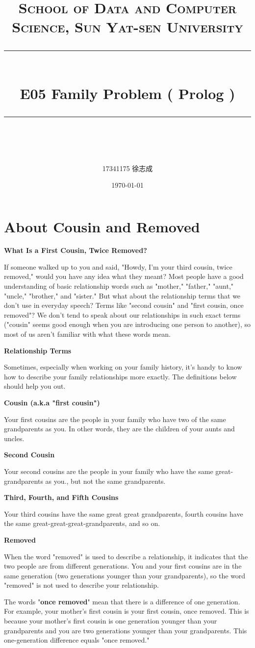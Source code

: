 ﻿\documentclass[a4paper, 11pt]{article}
\title{	
\normalfont \normalsize
\textsc{School of Data and Computer Science, Sun Yat-sen University} \\ [25pt] %
\rule{\textwidth}{0.5pt} \\[0.4cm] %
\huge  E05 Family Problem ( Prolog )\\ %
\rule{\textwidth}{2pt} \\[0.5cm] %
\author{17341175 徐志成}
\date{\normalsize\today}
}
\begin{document}
\maketitle
\tableofcontents
\newpage
\section{About Cousin and Removed}
\textbf{What Is a First Cousin, Twice Removed?}

If someone walked up to you and said, "Howdy, I'm your third cousin, twice removed," would you have any idea what they meant? Most people have a good understanding of basic relationship words such as "mother," "father," "aunt," "uncle," "brother," and "sister." But what about the relationship terms that we don't use in everyday speech? Terms like "second cousin" and "first cousin, once removed"? We don't tend to speak about our relationships in such exact terms ("cousin" seems good enough when you are introducing one person to another), so most of us aren't familiar with what these words mean.

\textbf{Relationship Terms}

Sometimes, especially when working on your family history, it's handy to know how to describe your family relationships more exactly. The definitions below should help you out.

\textbf{Cousin (a.k.a "first cousin")}

Your first cousins are the people in your family who have two of the same grandparents as you. In other words, they are the children of your aunts and uncles.

\textbf{Second Cousin}

Your second cousins are the people in your family who have the same great-grandparents as you., but not the same grandparents.

\textbf{Third, Fourth, and Fifth Cousins}

Your third cousins have the same great great grandparents, fourth cousins have the same great-great-great-grandparents, and so on.

\textbf{Removed}

When the word "removed" is used to describe a relationship, it indicates that the two people are from different generations. You and your first cousins are in the same generation (two generations younger than your grandparents), so the word "removed" is not used to describe your relationship.

The words "\textbf{once removed}" mean that there is a difference of one generation. For example, your mother's first cousin is your first cousin, once removed. This is because your mother's first cousin is one generation younger than your grandparents and you are two generations younger than your grandparents. This one-generation difference equals "once removed."
\end{document}
